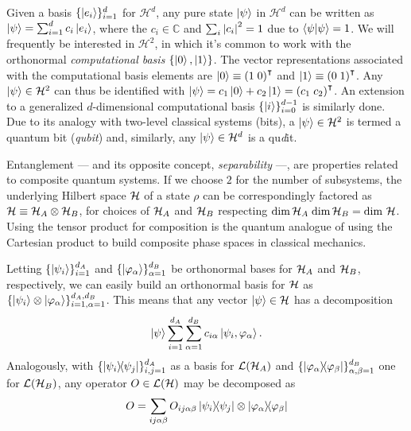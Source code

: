 		Given a basis $\{ \ket{e_i} \}_{i=1}^d$ for $\mathcal{H}^d$, any pure state $\ket{\psi}$ in $\mathcal{H}^d$ can be written as $\ket{\psi} = \sum_{i=1}^d c_i \ket{e_i}$, where the $c_i \in \mathbb{C}$ and $\sum_i \abs{c_i}^2 = 1$ due to $\braket{\psi}{\psi} = 1$. We will frequently be interested in $\mathcal{H}^2$, in which it's common to work with the orthonormal \emph{computational basis} $\{ \ket{0}, \ket{1} \}$. The vector representations associated with the computational basis elements are $\ket{0} \equiv \left( 1 \; 0 \right)^\intercal$ and $\ket{1} \equiv \left( 0 \; 1 \right)^\intercal$. Any $\ket{\psi} \in \mathcal{H}^2$ can thus be identified with $\ket{\psi} = c_1 \ket{0} + c_2 \ket{1} = \left( c_1 \; c_2 \right)^\intercal$. An extension to a generalized $d$-dimensional computational basis $\{ \ket{i} \}_{i=0}^{d-1}$ is similarly done. Due to its analogy with two-level classical systems (bits), a $\ket{\psi} \in \mathcal{H}^{2}$ is termed a quantum bit (\emph{qubit}) and, similarly, any $\ket{\psi} \in \mathcal{H}^{d}$ is a qu\emph{d}it.
	
	
		Entanglement --- and its opposite concept, \emph{separability} ---, are properties related to composite quantum systems. If we choose $2$ for the number of subsystems, the underlying Hilbert space $\mathcal{H}$ of a state $\rho$ can be correspondingly factored as $\mathcal{H} \equiv \mathcal{H}_A \otimes \mathcal{H}_B$, for choices of  $\mathcal{H}_A$ and $\mathcal{H}_B$ respecting $\text{dim} \,\mathcal{H}_A \; \text{dim} \,\mathcal{H}_B = \text{dim } \mathcal{H}$. Using the tensor product for composition is the quantum analogue of using the Cartesian product to build composite phase spaces in classical mechanics.
	
		Letting $\{ \ket{ \psi_i } \}_{i=1}^{d_A}$ and $\{ \ket{ \varphi_\alpha } \}_{\alpha=1}^{d_B}$ be orthonormal bases for $\mathcal{H}_A$ and $\mathcal{H}_B$, respectively, we can easily build an orthonormal basis for $\mathcal{H}$ as $\{ \ket{\psi_i} \otimes \ket{\varphi_\alpha} \}_{i=1, \alpha = 1}^{d_A, d_B}$. This means that any vector $\ket{\psi} \in \mathcal{H}$ has a decomposition
		\begin{equation}
			\ket{\psi} \sum_{i=1}^{d_A}\sum_{\alpha=1}^{d_B} c_{i\alpha} \ket{\psi_i, \varphi_\alpha} .
			\label{eq:pure-state-decomposition}
		\end{equation}
		Analogously, with $\{ \ketbra{\psi_i}{\psi_j} \}_{i,j=1}^{d_A}$ as a basis for $\mathcal{L}(\mathcal{H}_A)$ and $\{ \ketbra{\varphi_\alpha}{\varphi_\beta} \}_{\alpha,\beta=1}^{d_B}$ one for $\mathcal{L}(\mathcal{H}_B)$, any operator $O \in \mathcal{L}(\mathcal{H})$ may be decomposed as
		\begin{equation}
			O = \sum_{ij\alpha\beta} O_{ij\alpha\beta} \ketbra{\psi_i}{\psi_j} \otimes \ketbra{\varphi_\alpha}{\varphi_\beta}
			\label{eq:decomposed-operator}
		\end{equation}
	
